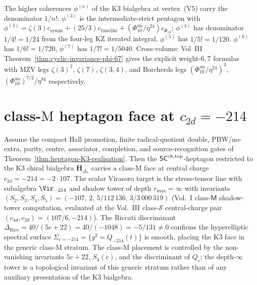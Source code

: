\begin{remark}
\label{rem:heptagon-K3-denominator}
The higher coherences $\phi^{(n)}$ of the K3 bialgebra at vertex~(V5)
carry the denominator $1/n!$: $\phi^{(3)}$ is the intermediate-strict
pentagon with $\phi^{(3)} = \zeta(3) c_{\mathrm{symm}} +
(25/3) c_{\mathrm{timelike}} + (\Phi_{10}^{\mathrm{un}}/\eta^{24}) c_{\Phi_{10}}$;
$\phi^{(4)}$ has denominator $1/4! = 1/24$ from the four-leg KZ iterated
integral, $\phi^{(5)}$ has $1/5! = 1/120$, $\phi^{(6)}$ has $1/6! = 1/720$,
$\phi^{(7)}$ has $1/7! = 1/5040$. Cross-volume: Vol~III
Theorem~\ref{thm:cyclic-invariance-phi-67} gives the explicit
weight-$6, 7$ formulas with MZV legs $\zeta(3)^2$, $\zeta(7)$,
$\zeta(3, 4)$, and Borcherds legs
$(\Phi_{10}^{\mathrm{un}}/\eta^{24})^3$,
$(\Phi_{10}^{\mathrm{un}})^{7/2}/\eta^{84}$ respectively.
\end{remark}

\section{class-$\mathrm M$ heptagon face at
$c_{2d} = -214$}
\label{sec:schtop-heptagon-supplement-ii}

\begin{remark}[K3 heptagon face at $c_{2d} = -214 = -2\cdot 107$;
\ClaimStatusConditional]
\label{rem:schtop-heptagon-k3-face}
Assume the compact Hall promotion, finite radical-quotient double,
PBW/no-extra, parity, centre, associator, completion, and
source-recognition gates of
Theorem~\ref{thm:heptagon-K3-realisation}. Then the
$\mathsf{SC}^{\mathrm{ch},\mathrm{top}}$-heptagon restricted to the K3 chiral bialgebra
$\mathbf H_{\Delta_5}$ carries a class-$\mathrm M$ face at central
charge $c_{2d} = -214 = -2\cdot 107$. The scalar Virasoro target is
the stress-tensor line with subalgebra $\Vir_{-214}$ and shadow tower
of depth $r_{\max} = \infty$ with invariants
$(S_2, S_3, S_4, S_5) = (-107,\, 2,\, 5/112\,136,\, 3/3\,000\,319)$
(Vol.~I class-$\mathsf M$ shadow-tower computation, evaluated at the
Vol.~III class-$\mathcal S$ central-charge pair
$(c_{4d},c_{2d})=(107/6,-214)$).
The Riccati discriminant
$\Delta_{\mathrm{Ricc}} = 40/(5c + 22) = 40/(-1048) = -5/131 \ne 0$
confirms the hyperelliptic spectral surface
$\Sigma_{c = -214} = \{y^2 = Q_{-214}(t)\}$ is smooth, placing the
K3 face in the generic class-$\mathrm M$ stratum. The class-$\mathrm M$
placement is controlled by the non-vanishing invariants
$5c+22$, $S_4(c)$, and the discriminant of $Q_c$; the depth-$\infty$
tower is a topological invariant of this generic stratum rather than
of any auxiliary presentation of the K3 bialgebra.
\end{remark}

